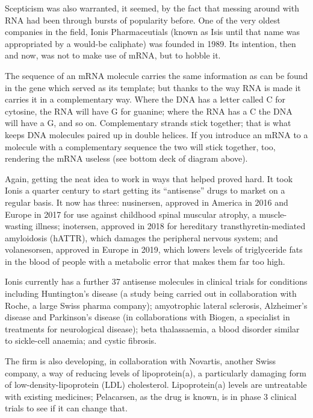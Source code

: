 \documentclass{article}
\begin{document}
Scepticism was also warranted, it seemed, by the fact that messing around with RNA had been through bursts of popularity before. One of the very oldest companies in the field, Ionis Pharmaceutials (known as Isis until that name was appropriated by a would-be caliphate) was founded in 1989. Its intention, then and now, was not to make use of mRNA, but to hobble it. 

The sequence of an mRNA molecule carries the same information as can be found in the gene which served as its template; but thanks to the way RNA is made it carries it in a complementary way. Where the DNA has a letter called C for cytosine, the RNA will have G for guanine; where the RNA has a C the DNA will have a G, and so on. Complementary strands stick together; that is what keeps DNA molecules paired up in double helices. If you introduce an mRNA to a molecule with a complementary sequence the two will stick together, too, rendering the mRNA useless (see bottom deck of diagram above). 

Again, getting the neat idea to work in ways that helped proved hard. It took Ionis a quarter century to start getting its ``antisense'' drugs to market on a regular basis. It now has three: nusinersen, approved in America in 2016 and Europe in 2017 for use against childhood spinal muscular atrophy, a muscle-wasting illness; inotersen, approved in 2018 for hereditary transthyretin-mediated amyloidosis (hATTR), which damages the peripheral nervous system; and volanesorsen, approved in Europe in 2019, which lowers levels of triglyceride fats in the blood of people with a metabolic error that makes them far too high. 

Ionis currently has a further 37 antisense molecules in clinical trials for conditions including Huntington's disease (a study being carried out in collaboration with Roche, a large Swiss pharma company); amyotrophic lateral sclerosis, Alzheimer's disease and Parkinson's disease (in collaborations with Biogen, a specialist in treatments for neurological disease); beta thalassaemia, a blood disorder similar to sickle-cell anaemia; and cystic fibrosis. 

The firm is also developing, in collaboration with Novartis, another Swiss company, a way of reducing levels of lipoprotein(a), a particularly damaging form of low-density-lipoprotein (LDL) cholesterol. Lipoprotein(a) levels are untreatable with existing medicines; Pelacarsen, as the drug is known, is in phase 3 clinical trials to see if it can change that. 
\end{document}
